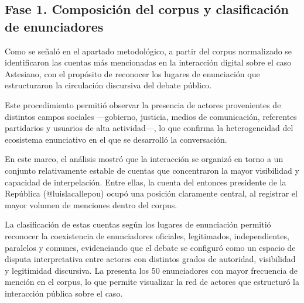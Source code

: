 \documentclass[spanish]{textolivre}
\begin{document}
\subsection{Fase 1. Composición del corpus y clasificación de enunciadores}\label{sec-listas}
Como se señaló en el apartado metodológico, a partir del corpus normalizado se identificaron las cuentas más mencionadas en la interacción digital sobre el caso Astesiano, con el propósito de reconocer los lugares de enunciación que estructuraron la circulación discursiva del debate público.

Este procedimiento permitió observar la presencia de actores provenientes de distintos campos sociales —gobierno, justicia, medios de comunicación, referentes partidarios y usuarios de alta actividad—, lo que confirma la heterogeneidad del ecosistema enunciativo en el que se desarrolló la conversación.

En este marco, el análisis mostró que la interacción se organizó en torno a un conjunto relativamente estable de cuentas que concentraron la mayor visibilidad y capacidad de interpelación. Entre ellas, la cuenta del entonces presidente de la República (@luislacallepou) ocupó una posición claramente central, al registrar el mayor volumen de menciones dentro del corpus.

La clasificación de estas cuentas según los lugares de enunciación permitió reconocer la coexistencia de enunciadores oficiales, legitimados, independientes, paralelos y comunes, evidenciando que el debate se configuró como un espacio de disputa interpretativa entre actores con distintos grados de autoridad, visibilidad y legitimidad discursiva. La  presenta los 50 enunciadores con mayor frecuencia de mención en el corpus, lo que permite visualizar la red de actores que estructuró la interacción pública sobre el caso.
\end{document}
